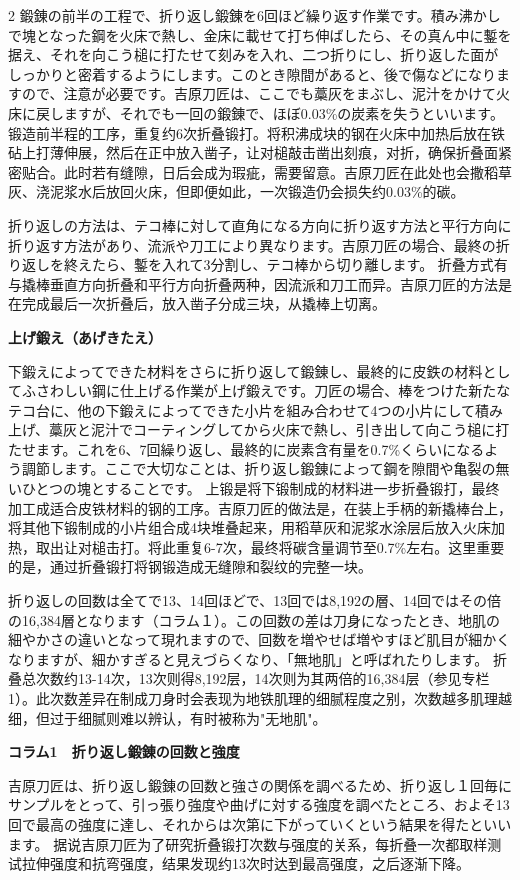 \documentclass[12pt,UTF8]{ctexbook}
\begin{document}
\begin{paracol}{2}
鍛錬の前半の工程で、折り返し鍛錬を6回ほど繰り返す作業です。積み沸かしで塊となった鋼を火床で熱し、金床に載せて打ち伸ばしたら、その真ん中に鏨を据え、それを向こう槌に打たせて刻みを入れ、二つ折りにし、折り返した面がしっかりと密着するようにします。このとき隙間があると、後で傷などになりますので、注意が必要です。吉原刀匠は、ここでも藁灰をまぶし、泥汁をかけて火床に戻しますが、それでも一回の鍛錬で、ほぼ0.03\%の炭素を失うといいます。
\switchcolumn*
锻造前半程的工序，重复约6次折叠锻打。将积沸成块的钢在火床中加热后放在铁砧上打薄伸展，然后在正中放入凿子，让对槌敲击凿出刻痕，对折，确保折叠面紧密贴合。此时若有缝隙，日后会成为瑕疵，需要留意。吉原刀匠在此处也会撒稻草灰、浇泥浆水后放回火床，但即便如此，一次锻造仍会损失约0.03\%的碳。
\switchcolumn*

折り返しの方法は、テコ棒に対して直角になる方向に折り返す方法と平行方向に折り返す方法があり、流派や刀工により異なります。吉原刀匠の場合、最終の折り返しを終えたら、鏨を入れて3分割し、テコ棒から切り離します。
\switchcolumn*
折叠方式有与撬棒垂直方向折叠和平行方向折叠两种，因流派和刀工而异。吉原刀匠的方法是在完成最后一次折叠后，放入凿子分成三块，从撬棒上切离。
\switchcolumn*

{\bfseries 上げ鍛え（あげきたえ）}
\switchcolumn*

下鍛えによってできた材料をさらに折り返して鍛錬し、最終的に皮鉄の材料としてふさわしい鋼に仕上げる作業が上げ鍛えです。刀匠の場合、棒をつけた新たなテコ台に、他の下鍛えによってできた小片を組み合わせて4つの小片にして積み上げ、藁灰と泥汁でコーティングしてから火床で熱し、引き出して向こう槌に打たせます。これを6、7回繰り返し、最終的に炭素含有量を0.7\%くらいになるよう調節します。ここで大切なことは、折り返し鍛錬によって鋼を隙間や亀裂の無いひとつの塊とすることです。
\switchcolumn*
上锻是将下锻制成的材料进一步折叠锻打，最终加工成适合皮铁材料的钢的工序。吉原刀匠的做法是，在装上手柄的新撬棒台上，将其他下锻制成的小片组合成4块堆叠起来，用稻草灰和泥浆水涂层后放入火床加热，取出让对槌击打。将此重复6-7次，最终将碳含量调节至0.7\%左右。这里重要的是，通过折叠锻打将钢锻造成无缝隙和裂纹的完整一块。
\switchcolumn*

折り返しの回数は全てで13、14回ほどで、13回では8,192の層、14回ではその倍の16,384層となります（コラム１）。この回数の差は刀身になったとき、地肌の細やかさの違いとなって現れますので、回数を増やせば増やすほど肌目が細かくなりますが、細かすぎると見えづらくなり、「無地肌」と呼ばれたりします。
\switchcolumn*
折叠总次数约13-14次，13次则得8,192层，14次则为其两倍的16,384层（参见专栏1）。此次数差异在制成刀身时会表现为地铁肌理的细腻程度之别，次数越多肌理越细，但过于细腻则难以辨认，有时被称为"无地肌"。
\switchcolumn*

{\bfseries コラム1　折り返し鍛錬の回数と強度}
\switchcolumn*

吉原刀匠は、折り返し鍛錬の回数と強さの関係を調べるため、折り返し１回毎にサンプルをとって、引っ張り強度や曲げに対する強度を調べたところ、およそ13回で最高の強度に達し、それからは次第に下がっていくという結果を得たといいます。
\switchcolumn*
据说吉原刀匠为了研究折叠锻打次数与强度的关系，每折叠一次都取样测试拉伸强度和抗弯强度，结果发现约13次时达到最高强度，之后逐渐下降。
\end{paracol}
\end{document}
